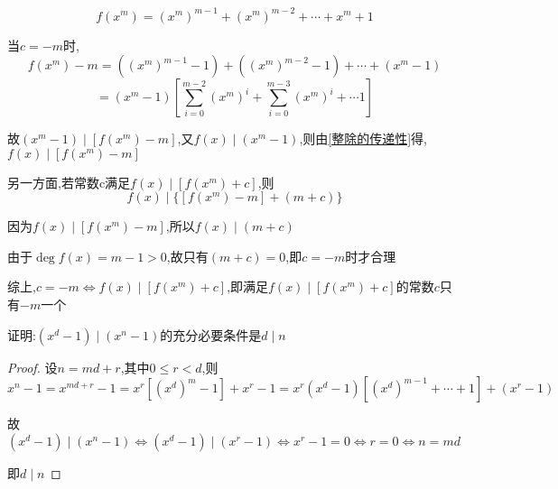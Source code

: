 \begin{solution}
    \begin{equation*}
        f(x^m)=(x^m)^{m-1}+(x^m)^{m-2}+\cdots + x^m+1
    \end{equation*}

    当$c=-m$时,
    \begin{equation*}
        f(x^m)-m=((x^m)^{m-1}-1)+((x^m)^{m-2}-1)+\cdots + (x^m-1)
    \end{equation*}
    \begin{equation*}
        =(x^m-1)[\overset{m-2}{\underset{i=0}{\sum}}(x^m)^i+\overset{m-3}{\underset{i=0}{\sum}}(x^m)^i+\cdots
        1]
    \end{equation*}

    故$(x^m-1)\mid [f(x^m)-m]$,又$f(x)\mid (x^m-1)$,则由\cref{整除的传递性}得,$f(x)\mid [f(x^m)-m]$

    \vspace{4pt}
    另一方面,若常数c满足$f(x)\mid [f(x^m)+c]$,则
    \begin{equation*}
        f(x)\mid \{[f(x^m)-m]+(m+c)\}
    \end{equation*}

    因为$f(x)\mid [f(x^m)-m]$,所以$f(x)\mid (m+c)$

    由于$\deg f(x)=m-1>0$,故只有$(m+c)=0$,即$c=-m$时才合理

    \vspace{4pt}
    综上,$c=-m \Longleftrightarrow f(x)\mid {[f(x^m)+c]}$,即满足$f(x)\mid {[f(x^m)+c]}$的常数$c$只有$-m$一个
\end{solution}

\begin{example}
    证明:$(x^d-1)\mid (x^n-1)$的充分必要条件是$d\mid n$
\end{example}

\begin{proof}
    设$n=md+r$,其中$0\le r <d$,则
    \begin{equation*}
        x^n-1=x^{md+r}-1=x^r[(x^d)^m-1]+x^r-1=x^r(x^d-1)[(x^d)^{m-1}+\cdots +1]+(x^r-1)
    \end{equation*}

    故$(x^d-1)\mid (x^n-1) \Longleftrightarrow (x^d-1)\mid (x^r-1)\Longleftrightarrow x^r-1=0\Longleftrightarrow r=0 \Longleftrightarrow n=md$

    即$d\mid n$
\end{proof}
